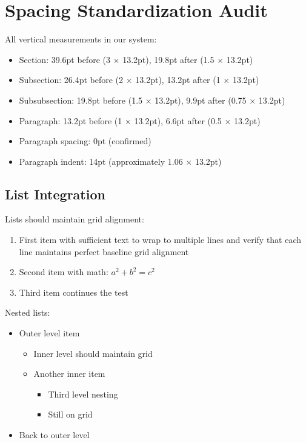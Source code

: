 \documentclass[11pt]{article}
\begin{document}

\section{Spacing Standardization Audit}

All vertical measurements in our system:
\begin{itemize}
\item Section: 39.6pt before (3 × 13.2pt), 19.8pt after (1.5 × 13.2pt)
\item Subsection: 26.4pt before (2 × 13.2pt), 13.2pt after (1 × 13.2pt)
\item Subsubsection: 19.8pt before (1.5 × 13.2pt), 9.9pt after (0.75 × 13.2pt)
\item Paragraph: 13.2pt before (1 × 13.2pt), 6.6pt after (0.5 × 13.2pt)
\item Paragraph spacing: 0pt (confirmed)
\item Paragraph indent: 14pt (approximately 1.06 × 13.2pt)
\end{itemize}


\subsection{List Integration}

Lists should maintain grid alignment:
\begin{enumerate}
\item First item with sufficient text to wrap to multiple lines and verify that each line maintains perfect baseline grid alignment
\item Second item with math: $a^2 + b^2 = c^2$
\item Third item continues the test
\end{enumerate}

Nested lists:
\begin{itemize}
\item Outer level item
  \begin{itemize}
  \item Inner level should maintain grid
  \item Another inner item
    \begin{itemize}
    \item Third level nesting
    \item Still on grid
    \end{itemize}
  \end{itemize}
\item Back to outer level
\end{itemize}
\end{document}
